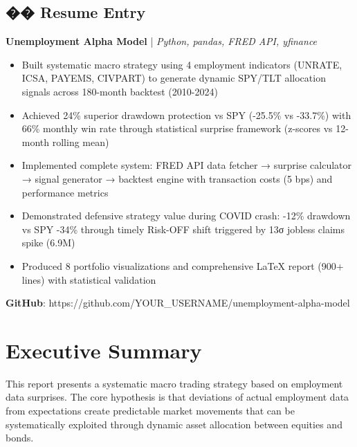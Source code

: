 \documentclass[12pt,a4paper]{article}
\begin{document}
\subsection*{�� Resume Entry}

\textbf{Unemployment Alpha Model} | \textit{Python, pandas, FRED API, yfinance}
\begin{itemize}[leftmargin=*]
    \item Built systematic macro strategy using 4 employment indicators (UNRATE, ICSA, PAYEMS, CIVPART) to generate dynamic SPY/TLT allocation signals across 180-month backtest (2010-2024)
    \item Achieved 24\% superior drawdown protection vs SPY (-25.5\% vs -33.7\%) with 66\% monthly win rate through statistical surprise framework (z-scores vs 12-month rolling mean)
    \item Implemented complete system: FRED API data fetcher → surprise calculator → signal generator → backtest engine with transaction costs (5 bps) and performance metrics
    \item Demonstrated defensive strategy value during COVID crash: -12\% drawdown vs SPY -34\% through timely Risk-OFF shift triggered by 13σ jobless claims spike (6.9M)
    \item Produced 8 portfolio visualizations and comprehensive LaTeX report (900+ lines) with statistical validation
\end{itemize}

\vfill

\textbf{GitHub}: https://github.com/YOUR\_USERNAME/unemployment-alpha-model

\newpage
\tableofcontents
\newpage

\section{Executive Summary}

This report presents a systematic macro trading strategy based on employment data surprises. The core hypothesis is that deviations of actual employment data from expectations create predictable market movements that can be systematically exploited through dynamic asset allocation between equities and bonds.
\end{document}
